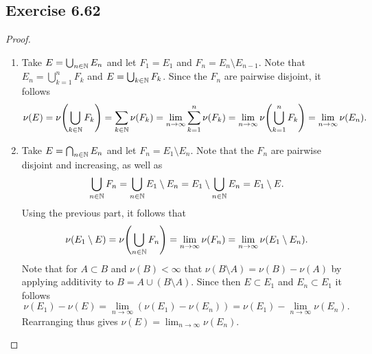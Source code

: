 \documentclass[hw_all.tex]{subfiles}
\begin{document}
\subsection{Exercise 6.62}

\begin{proof}
    \begin{enumerate}
        \item
            Take $E = \bigcup_{n \in \mathbb{N}} E_n$ and let $F_1 = E_1$ and $F_n = E_n \setminus E_{n-1}$. Note that $E_n = \bigcup_{k=1}^n F_k$ and $E = \bigcup_{k \in \mathbb{N}} F_k$. Since the $F_n$ are pairwise disjoint, it follows
            \[
                \nu(E) = \nu\qty(\bigcup_{k \in \mathbb{N}} F_k) = \sum_{k \in \mathbb{N}} \nu(F_k) = \lim_{n \to \infty} \sum_{k=1}^n \nu(F_k) = \lim_{n \to \infty} \nu\qty(\bigcup_{k=1}^n F_k) = \lim_{n \to \infty} \nu(E_n)
            .\]

        \item 
            Take $E = \bigcap_{n \in \mathbb{N}} E_n$ and let $F_n = E_1 \setminus E_n$. Note that the $F_n$ are pairwise disjoint and increasing, as well as
            \[
                \bigcup_{n \in \mathbb{N}} F_n = \bigcup_{n \in \mathbb{N}} E_1 \setminus E_n = E_1 \setminus \bigcup_{n \in \mathbb{N}} E_n = E_1 \setminus E
            .\]
            Using the previous part, it follows that
            \[
                \nu(E_1 \setminus E) = \nu\qty(\bigcup_{n \in \mathbb{N}} F_n) = \lim_{n \to \infty} \nu(F_n) = \lim_{n \to \infty} \nu(E_1 \setminus E_n)
            .\]
            Note that for $A \subset B$ and $\nu(B) < \infty$ that $\nu(B \setminus A) = \nu(B) - \nu(A)$ by applying additivity to $B = A \cup (B \setminus A)$. Since then $E \subset E_1$ and $E_n \subset E_1$ it follows
            \[
                \nu(E_1) - \nu(E) = \lim_{n \to \infty} (\nu(E_1) - \nu(E_n)) = \nu(E_1) - \lim_{n \to \infty} \nu(E_n)
            .\]
            Rearranging thus gives $\nu(E) = \lim_{n \to \infty} \nu(E_n)$.
    \end{enumerate}
\end{proof}
\end{document}
